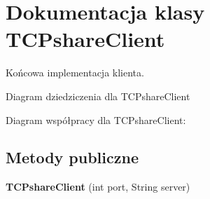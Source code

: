 \hypertarget{classTCPshareClient}{\section{Dokumentacja klasy T\+C\+Pshare\+Client}
\label{classTCPshareClient}
}


Końcowa implementacja klienta.  




Diagram dziedziczenia dla T\+C\+Pshare\+Client


Diagram współpracy dla T\+C\+Pshare\+Client\+:
\subsection*{Metody publiczne}
\begin{DoxyCompactItemize}
\item 
\hypertarget{classTCPshareClient_a10cdc0a57a837e03075272e5066bdf77}{{\bfseries T\+C\+Pshare\+Client} (int port, String server)}\label{classTCPshareClient_a10cdc0a57a837e03075272e5066bdf77}


\end{DoxyCompactItemize}
